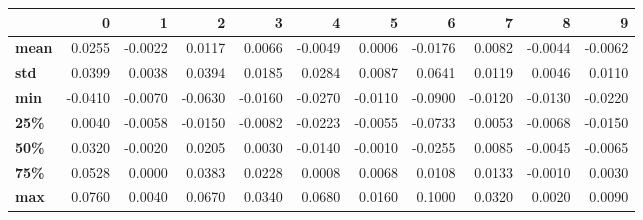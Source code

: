 \begin{tabular}{lrrrrrrrrrr}
\toprule
{} &       0 &       1 &       2 &       3 &       4 &       5 &       6 &       7 &       8 &       9 \\
\midrule
\textbf{mean} &  0.0255 & -0.0022 &  0.0117 &  0.0066 & -0.0049 &  0.0006 & -0.0176 &  0.0082 & -0.0044 & -0.0062 \\
\textbf{std } &  0.0399 &  0.0038 &  0.0394 &  0.0185 &  0.0284 &  0.0087 &  0.0641 &  0.0119 &  0.0046 &  0.0110 \\
\textbf{min } & -0.0410 & -0.0070 & -0.0630 & -0.0160 & -0.0270 & -0.0110 & -0.0900 & -0.0120 & -0.0130 & -0.0220 \\
\textbf{25\% } &  0.0040 & -0.0058 & -0.0150 & -0.0082 & -0.0223 & -0.0055 & -0.0733 &  0.0053 & -0.0068 & -0.0150 \\
\textbf{50\% } &  0.0320 & -0.0020 &  0.0205 &  0.0030 & -0.0140 & -0.0010 & -0.0255 &  0.0085 & -0.0045 & -0.0065 \\
\textbf{75\% } &  0.0528 &  0.0000 &  0.0383 &  0.0228 &  0.0008 &  0.0068 &  0.0108 &  0.0133 & -0.0010 &  0.0030 \\
\textbf{max } &  0.0760 &  0.0040 &  0.0670 &  0.0340 &  0.0680 &  0.0160 &  0.1000 &  0.0320 &  0.0020 &  0.0090 \\
\bottomrule
\end{tabular}
